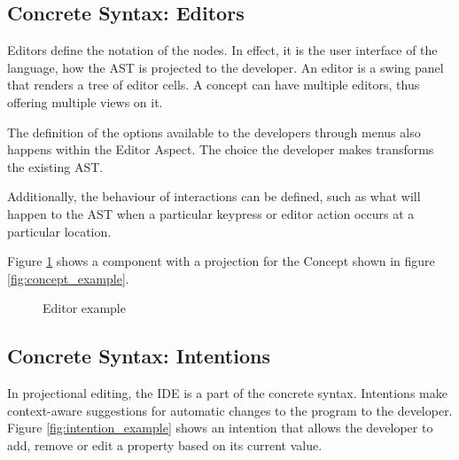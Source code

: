 \subsection{Concrete Syntax: Editors}
Editors define the notation of the nodes.
In effect, it is the user interface of the language, how the AST is projected to the developer.
An editor is a swing panel that renders a tree of editor cells.
A concept can have multiple editors, thus offering multiple views on it.

The definition of the options available to the developers through menus also happens within the Editor Aspect. 
The choice the developer makes transforms the existing AST.

Additionally, the behaviour of interactions can be defined, such as what will happen to the AST when a particular keypress or editor action occurs at a particular location.

Figure \ref{fig:editor_example} shows a component with a projection for the Concept shown in figure \ref{fig:concept_example}.

\begin{figure}[h]
    \centering
    \caption{Editor example}
    \label{fig:editor_example}
\end{figure}
 
\subsection{Concrete Syntax: Intentions}
In projectional editing, the IDE is a part of the concrete syntax.
Intentions make context-aware suggestions for automatic changes to the program to the developer.
Figure \ref{fig:intention_example} shows an intention that allows the developer to add, remove or edit a property based on its current value.

